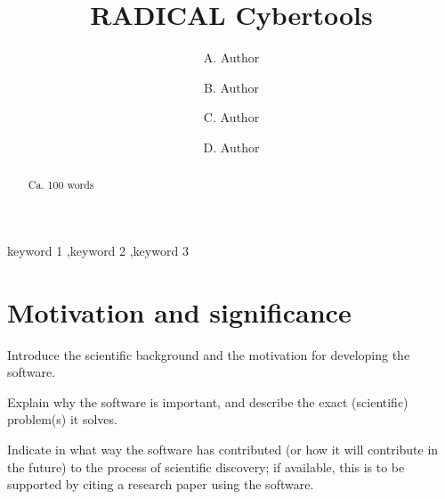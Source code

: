 \documentclass[preprint,12pt, a4paper]{elsarticle}
\begin{document}
\begin{frontmatter}

\title{RADICAL Cybertools}

\author{A. Author}
\address{Your institute, some address}

\author{B. Author}
\address{Your institute, some address}

\author{C. Author}
\address{Your institute, some address}

\author{D. Author}
\address{Your institute, some address}

\begin{abstract}
Ca. 100 words
\end{abstract}

\begin{keyword}
keyword 1 \sep keyword 2 \sep keyword 3



\end{keyword}

\end{frontmatter}

\linenumbers



\section{Motivation and significance}\label{sec:motivation}

Introduce the scientific background and the motivation for developing the
software.

Explain why the software is important, and describe the exact (scientific)
problem(s) it solves.

Indicate in what way the software has contributed (or how it will contribute
in the future) to the process of scientific discovery; if available, this is
to be supported by citing a research paper using the software.
\end{document}
